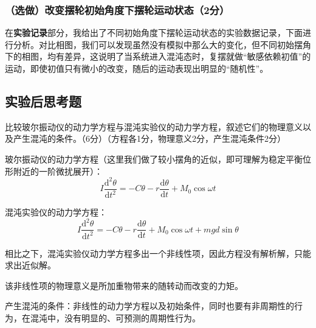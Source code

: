 \documentclass[dvipsnames, svgnames,a4paper,11pt]{article}
\begin{document}
	\subsubsection{（选做）改变摆轮初始角度下摆轮运动状态（2分）}
	在\textbf{实验记录}部分，我给出了不同初始角度下摆轮运动状态的实验数据记录，下面进行分析。对比相图，我们可以发现虽然没有模拟中那么大的变化，但不同初始摆角下的相图，均有差异，这说明了当系统进入混沌态时，复摆就做“敏感依赖初值”的运动，即使初值只有微小的改变，随后的运动表现出明显的“随机性”。
	
	
	\clearpage
	\subsection{实验后思考题}
	\begin{question}
		比较玻尔振动仪的动力学方程与混沌实验仪的动力学方程，叙述它们的物理意义以及产生混沌的条件。（6分）（方程各1分，物理意义2分，产生混沌条件2分）
	\end{question}
	玻尔振动仪的动力学方程（这里我们做了较小摆角的近似，即可理解为稳定平衡位形附近的一阶微扰展开）：
	\[I\frac{\mathrm{d}^2\theta }{\mathrm{d} t^2}=-C\theta-r\frac{\mathrm{d}\theta}{\mathrm{d} t}+M_0\cos\omega t\]
	
	混沌实验仪的动力学方程：
	\[I\frac{\mathrm{d}^2\theta }{\mathrm{d} t^2}=-C\theta-r\frac{\mathrm{d}\theta}{\mathrm{d} t}+M_0\cos\omega t+mgd\sin\theta\]
	
	相比之下，混沌实验仪动力学方程多出一个非线性项，因此方程没有解析解，只能求出近似解。 
	
	该非线性项的物理意义是所加重物带来的随转动而改变的力矩。 
	
	产生混沌的条件：非线性的动力学方程以及初始条件，同时也要有非周期性的行为，在混沌中，没有明显的、可预测的周期性行为。
	
\end{document}
